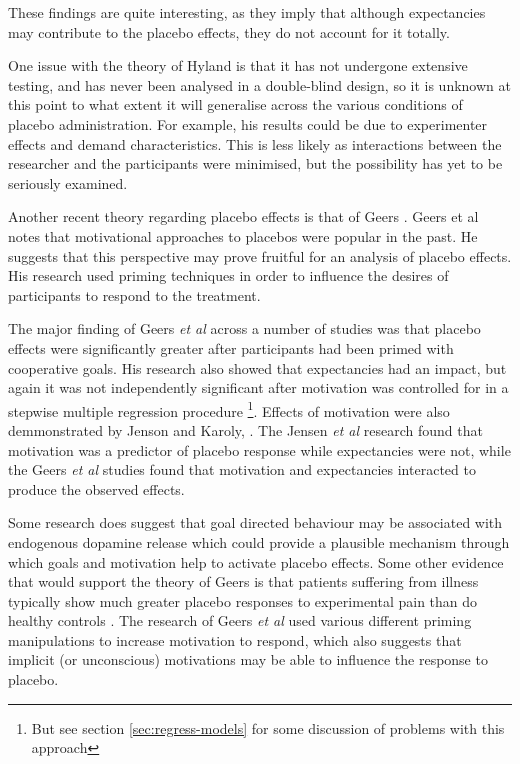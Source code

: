 These findings are quite interesting, as they imply that although expectancies may contribute to the placebo effects, they do not account for it totally. 



One issue with the theory of Hyland is that it has not undergone extensive testing, and has never been analysed in a double-blind design, so it is unknown at this point to what extent it will generalise across the various conditions of placebo administration. For example, his results could be due to experimenter effects and demand characteristics. This is less likely as interactions between the researcher and the participants were minimised, but the possibility has yet to be seriously examined. 

Another recent theory regarding placebo effects is that of Geers \cite{Geers2005a}. Geers et al notes that  motivational approaches to placebos were popular in the past.  He suggests that this perspective may prove fruitful for an analysis of placebo effects.   His research used priming techniques in order to influence the desires of  participants to respond to the treatment. 

The major finding of Geers \textit{et al} across a number of studies \cite{Geers2007,Geers2005a} was that placebo effects were significantly greater after participants had been primed with cooperative goals. His research also showed that expectancies had an impact, but again it was not independently significant after motivation was controlled for in a stepwise multiple regression procedure \footnote{But see section \ref{sec:regress-models} for some discussion of problems with this approach}. Effects of motivation were also demmonstrated by Jenson and Karoly, \cite{Jensen1991}. The Jensen \textit{et al }   research found that motivation was a predictor of placebo response while expectancies were not, while the Geers \textit{et al } studies found that motivation and expectancies interacted to produce the observed effects.

Some research does suggest that goal directed behaviour may be associated with endogenous dopamine release \cite{Scott2007a} which could provide a plausible mechanism through which  goals and motivation help to activate placebo effects. Some other evidence that would support the theory of Geers is that patients suffering from illness typically show much greater placebo responses to experimental pain than do healthy controls \cite{Klinger2007a}. The research of Geers \textit{et al } used various different priming manipulations to increase motivation to respond, which also suggests that implicit (or unconscious) motivations may be able to influence the response to placebo. 

